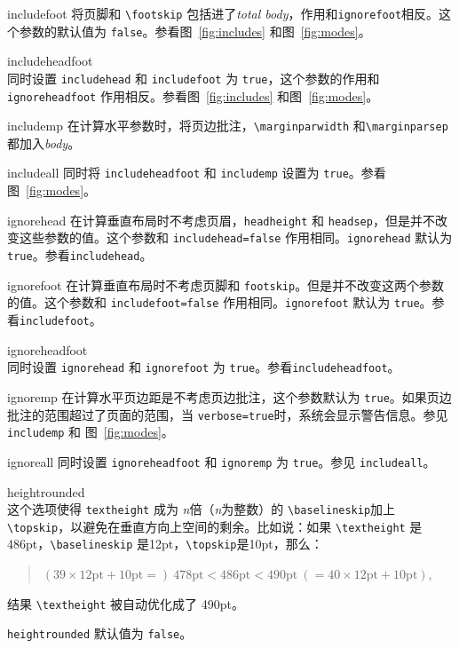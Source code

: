 \documentclass[titlepage]{ctexart}
\newcommand{\gpart}[1]{\textsf{\textsl{\color[rgb]{.0,.45,.7}#1}}}
\newenvironment{Options}%
  {\begin{list}{}{%
   \renewcommand{\makelabel}[1]{\texttt{##1}\hfil}%
   \setlength{\itemsep}{-.5\parsep}
   \settowidth{\labelwidth}{\texttt{xxxxxxxxxxx\space}}%
   \setlength{\leftmargin}{\labelwidth}%
   \addtolength{\leftmargin}{\labelsep}}%
   \raggedright}
  {\end{list}}
\begin{document}
\begin{Options}
	  \item[includefoot] 将页脚和 \verb|\footskip| 包括进了\gpart{total body}，作用和\verb|ignorefoot|相反。这个参数的默认值为 \verb|false|。参看图~\ref{fig:includes} 和图~\ref{fig:modes}。
	  \item[includeheadfoot]~\\
	  同时设置 \verb|includehead| 和 \verb|includefoot| 为 \verb|true|，这个参数的作用和\verb|ignoreheadfoot| 作用相反。参看图~\ref{fig:includes} 和图~\ref{fig:modes}。
	  \item[includemp] 在计算水平参数时，将页边批注，\verb|\marginparwidth| 和\verb|\marginparsep| 都加入\gpart{body}。
	  \item[includeall] 同时将 \verb|includeheadfoot| 和 \verb|includemp| 设置为 \verb|true|。参看图~\ref{fig:modes}。
	  \item[ignorehead] 在计算垂直布局时不考虑页眉，\verb|headheight| 和 \verb|headsep|，但是并不改变这些参数的值。这个参数和 \verb|includehead=false| 作用相同。\verb|ignorehead| 默认为 \verb|true|。参看\verb|includehead|。
	  \item[ignorefoot] 在计算垂直布局时不考虑页脚和 \verb|footskip|。但是并不改变这两个参数的值。这个参数和 \verb|includefoot=false| 作用相同。\verb|ignorefoot| 默认为 \verb|true|。参看\verb|includefoot|。
	  \item[ignoreheadfoot]~\\
	  同时设置 \verb|ignorehead| 和 \verb|ignorefoot| 为 \verb|true|。参看\verb|includeheadfoot|。
	  \item[ignoremp] 在计算水平页边距是不考虑页边批注，这个参数默认为 \verb|true|。如果页边批注的范围超过了页面的范围，当 \verb|verbose=true|时，系统会显示警告信息。参见 \verb|includemp| 和 图~\ref{fig:modes}。
	  \item[ignoreall] 同时设置 \verb|ignoreheadfoot| 和 \verb|ignoremp| 为 \verb|true|。参见 \verb|includeall|。
	  \item[heightrounded]~\\
	  这个选项使得 \verb|textheight| 成为 \textit{n}倍（\textit{n}为整数）的 \verb|\baselineskip|加上\verb|\topskip|，以避免在垂直方向上空间的剩余。比如说：如果 \verb|\textheight| 是486pt，\verb|\baselineskip| 是12pt，\verb|\topskip|是10pt，那么：
	  \begin{quote}
	  $(39\times12\textrm{pt}+10\textrm{pt}=)\: 478\textrm{pt}
	  < 486\textrm{pt} <
	  490\textrm{pt} \:(=40\times12\textrm{pt}+10\textrm{pt})$,
	  \end{quote}
	  结果 \verb|\textheight| 被自动优化成了 490pt。
	  
	  \verb|heightrounded| 默认值为 \verb|false|。
	   \end{Options}
\end{document}
